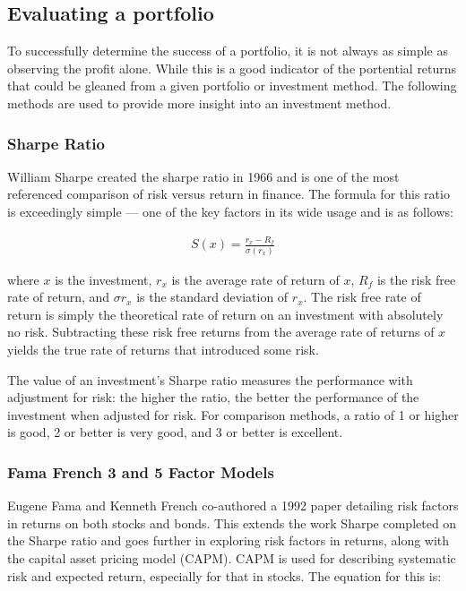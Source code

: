 \documentclass[ oneside,%
                    author={Joshua Felmeden},
                    degree={MEng},
                     title={Semantic Analysis of Financial Headlines Based on Realised Stock Returns},
                  subtitle={}]{dissertation}
\begin{document}
\subsection{Evaluating a portfolio}
To successfully determine the success of a portfolio, it is not always as simple as observing the profit alone. While this is a good indicator of the portential returns that could be gleaned from a given portfolio or investment method. The following methods are used to provide more insight into an investment method.

\subsubsection{Sharpe Ratio}
William Sharpe created the sharpe ratio in 1966 and is one of the most referenced comparison of risk versus return in finance. The formula for this ratio is exceedingly simple --- one of the key factors in its wide usage and is as follows:

\begin{align*}
S(x) = \frac{r_x - R_f}{\sigma(r_x)}
\end{align*}

\noindent
where $x$ is the investment, $r_x$ is the average rate of return of $x$, $R_f$ is the risk free rate of return, and $\sigma{r_x}$ is the standard deviation of $r_x$. The risk free rate of return is simply the theoretical rate of return on an investment with absolutely no risk. Subtracting these risk free returns from the average rate of returns of $x$ yields the true rate of returns that introduced some risk.

The value of an investment's Sharpe ratio measures the performance with adjustment for risk: the higher the ratio, the better the performance of the investment when adjusted for risk. For comparison methods, a ratio of 1 or higher is good, 2 or better is very good, and 3 or better is excellent. 

\subsubsection{Fama French 3 and 5 Factor Models}
Eugene Fama and Kenneth French co-authored a 1992 paper detailing risk factors in returns on both stocks and bonds. This extends the work Sharpe completed on the Sharpe ratio and goes further in exploring risk factors in returns, along with the capital asset pricing model (CAPM). CAPM is used for describing systematic risk and expected return, especially for that in stocks. The equation for this is:
\end{document}
